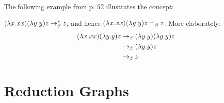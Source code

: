 The following example from \cite{Barendregt} p. 52 illustrates the concept:
\begin{example}
	$(\lambda x.xx)(\lambda y.y)z\rightarrow_\beta^* z$, and hence $(\lambda x.xx)(\lambda y.y)z =_\beta z$.
	More elaborately:
\begin{align*}
	(\lambda x.xx)(\lambda y.y)z&\rightarrow_\beta(\lambda y.y)(\lambda y.y)z \\
	&\rightarrow_\beta(\lambda y.y)z \\
	&\rightarrow_\beta z
\end{align*}
\end{example}


\section{Reduction Graphs}

